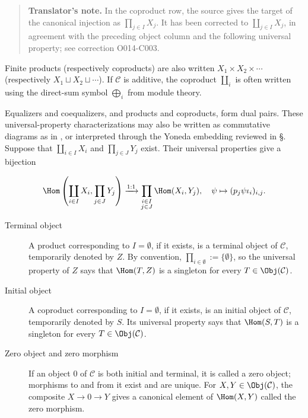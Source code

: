 \begin{quote}\small
\textbf{Translator's note.} In the coproduct row, the source gives the target of the canonical injection as $\prod_{j\in I}X_j$. It has been corrected to $\coprod_{j\in I}X_j$, in agreement with the preceding object column and the following universal property; see correction O014-C003.
\end{quote}

Finite products (respectively coproducts) are also written $X_1\times X_2\times\cdots$ (respectively $X_1\sqcup X_2\sqcup\cdots$). If $\mathcal C$ is additive, the coproduct $\coprod_i$ is often written using the direct-sum symbol $\bigoplus_i$ from module theory.

Equalizers and coequalizers, and products and coproducts, form dual pairs. These universal-property characterizations may also be written as commutative diagrams as in \cite[\S~2.7]{Li1}, or interpreted through the Yoneda embedding reviewed in \S{}. Suppose that $\coprod_{i\in I}X_i$ and $\prod_{j\in J}Y_j$ exist. Their universal properties give a bijection

\[ \Hom\left( \coprod_{i \in I} X_i, \prod_{j \in J} Y_j \right)
\xrightarrow{1:1} \prod_{\substack{i \in I \\ j \in J}} \Hom(X_i, Y_j),
\quad \psi \mapsto (p_j \psi \iota_i)_{i,j} . \]

\begin{description}
	\item[Terminal object] A product corresponding to $I=\emptyset$, if it exists, is a terminal object of $\mathcal C$, temporarily denoted by $Z$. By convention, $\prod_{i\in\emptyset}:=\{\emptyset\}$, so the universal property of $Z$ says that $\Hom(T,Z)$ is a singleton for every $T\in\Obj(\mathcal C)$.
	\item[Initial object] A coproduct corresponding to $I=\emptyset$, if it exists, is an initial object of $\mathcal C$, temporarily denoted by $S$. Its universal property says that $\Hom(S,T)$ is a singleton for every $T\in\Obj(\mathcal C)$.
	\item[Zero object and zero morphism] If an object $0$ of $\mathcal C$ is both initial and terminal, it is called a zero object; morphisms to and from it exist and are unique. For $X,Y\in\Obj(\mathcal C)$, the composite $X\to0\to Y$ gives a canonical element of $\Hom(X,Y)$ called the zero morphism.
\end{description}


